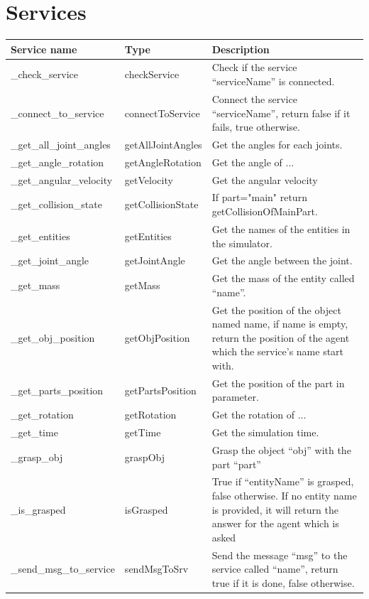 \documentclass[notitlepage]{report}
\begin{document}
\chapter{Services}
\begin{supertabular}{|p{3cm}|p{3cm}|p{7cm}|}
	\hline
    Service name & Type & Description \\
  	\hline
  	\_check\_service & checkService & Check if the service ``serviceName'' is connected.\\
  	\hline
  	\_connect\_to\_service & 
  		connectToService & Connect the service ``serviceName'', return false if it fails, true otherwise.\\
  	\hline
  	\_get\_all\_joint\_angles & 
  		getAllJointAngles
  		& Get the angles for each joints.\\
  	\hline
  	\_get\_angle\_rotation & 
  		getAngleRotation & Get the angle of ...\\
  	\hline
  	\_get\_angular\_velocity & 
  		getVelocity & Get the angular velocity\\
  	\hline
  	\_get\_collision\_state & 
  		getCollisionState & If part="main" return getCollisionOfMainPart.\\
  	\hline
  	\_get\_entities & getEntities
    & Get the names of the entities in the simulator.\\
  	\hline
  	\_get\_joint\_angle & 
  		getJointAngle & Get the angle between the joint.\\
  	\hline
  	\_get\_mass & 
  		getMass
  		& Get the mass of the entity called ``name''.\\
  	\hline
  	\_get\_obj\_position & getObjPosition
  		 & Get the position of the object named name, if name is empty, return the position of the agent which the service's name start with.\\
  	\hline
  	\_get\_parts\_position & 
  		getPartsPosition & Get the position of the part in parameter.\\
  	\hline
  	\_get\_rotation & 
  		getRotation & Get the rotation of ...\\
  	\hline
  	\_get\_time &  getTime & Get the simulation time.\\
  	\hline
  	\_grasp\_obj & 
  		graspObj & Grasp the object ``obj'' with the part ``part''\\
  	\hline
  	\_is\_grasped & isGrasped & True if ``entityName'' is grasped, false otherwise. If no entity name is provided, it will return the answer for the agent which is asked\\
  	\hline
  	\_send\_msg\_to\_service & 
  		sendMsgToSrv & Send the message ``msg'' to the service called ``name'', return true if it is done, false otherwise.\\
  	\hline
\end{supertabular}
\end{document}
